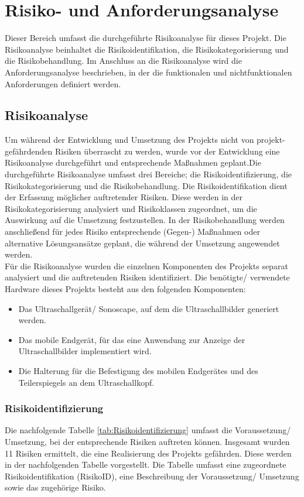 \chapter{Risiko- und Anforderungsanalyse}
Dieser Bereich umfasst die durchgeführte Risikoanalyse für dieses Projekt. Die Risikoanalyse beinhaltet die Risikoidentifikation, die Risikokategorisierung und die Risikobehandlung. Im Anschluss an die Risikoanalyse wird die Anforderungsanalyse beschrieben, in der die funktionalen und nichtfunktionalen Anforderungen definiert werden. 
\section{Risikoanalyse} \label{RisikoAnalyse}
Um während der Entwicklung und Umsetzung des Projekts nicht von projekt- \linebreak 
gefährdenden Risiken überrascht zu werden, wurde vor der Entwicklung eine Risikoanalyse durchgeführt und entsprechende Maßnahmen geplant.Die durchgeführte Risikoanalyse umfasst drei Bereiche; die Risikoidentifizierung, die Risikokategorisierung und die Risikobehandlung. Die Risikoidentifikation dient der Erfassung möglicher auftretender Risiken. Diese werden in der Risikokategorisierung analysiert und Risikoklassen zugeordnet, um die Auswirkung auf die Umsetzung festzustellen. In der Risikobehandlung werden anschließend für jedes Risiko entsprechende (Gegen-) Maßnahmen oder alternative Lösungsansätze geplant, die während der Umsetzung angewendet werden.\\
Für die Risikoanalyse wurden die einzelnen Komponenten des Projekts separat analysiert und die auftretenden Risiken identifiziert. Die benötigte/ verwendete Hardware dieses Projekts besteht aus den folgenden Komponenten:
\begin{itemize}
\item Das Ultraschallgerät/ Sonoscape, auf dem die Ultraschallbilder generiert werden.
\item Das mobile Endgerät, für das eine Anwendung zur Anzeige der Ultraschallbilder implementiert wird.
\item Die Halterung für die Befestigung des mobilen Endgerätes und des Teilerspiegels an dem Ultraschallkopf.
\end{itemize}

\subsection{Risikoidentifizierung}
Die nachfolgende Tabelle \ref{tab:Risikoidentifizierung} umfasst die Voraussetzung/ Umsetzung, bei der entsprechende Risiken auftreten können. Insgesamt wurden 11 Risiken ermittelt, die eine Realisierung des Projekts gefährden. Diese werden in der nachfolgenden Tabelle vorgestellt. Die Tabelle umfasst eine zugeordnete Risikoidentifikation (RisikoID), eine Beschreibung der Voraussetzung/ Umsetzung sowie das zugehörige Risiko. 

